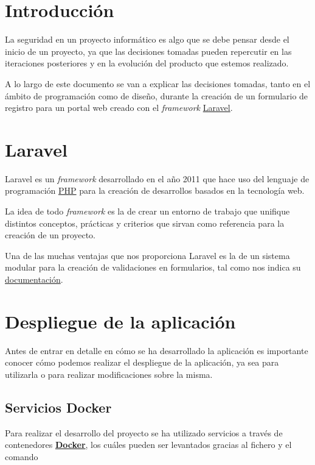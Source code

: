 \documentclass{\ClassPath/viu-tfm-template}
\begin{document}
\graphicspath{{../../VIU_TFM_LaTeX_template/}}

\coverpage

\tableofcontents

\chapter{Introducción}

La seguridad en un proyecto informático es algo que se debe pensar desde el inicio de un proyecto, ya que las decisiones tomadas pueden repercutir en las iteraciones posteriores y en la evolución del producto que estemos realizado.

A lo largo de este documento se van a explicar las decisiones tomadas, tanto en el ámbito de programación como de diseño, durante la creación de un formulario de registro para un portal web creado con el \textit{framework} \href{https://laravel.com/}{Laravel}.


\chapter{Laravel}

Laravel es un \textit{framework} desarrollado en el año 2011 que hace uso del lenguaje de programación \href{https://www.php.net/}{PHP} para la creación de desarrollos basados en la tecnología web.

La idea de todo \textit{framework} es la de crear un entorno de trabajo que unifique distintos conceptos, prácticas y criterios que sirvan como referencia para la creación de un proyecto.

Una de las muchas ventajas que nos proporciona Laravel es la de un sistema modular para la creación de validaciones en formularios, tal como nos indica su \href{https://laravel.com/docs/6.x/validation}{documentación}.

\chapter{Despliegue de la aplicación}
Antes de entrar en detalle en cómo se ha desarrollado la aplicación es importante conocer cómo podemos realizar el despliegue de la aplicación, ya sea para utilizarla o para realizar modificaciones sobre la misma.

\section{Servicios Docker}
Para realizar el desarrollo del proyecto se ha utilizado servicios a través de contenedores \textbf{\href{https://www.docker.com/}{Docker}}, los cuáles pueden ser levantados gracias al fichero  y el comando 
\end{document}
